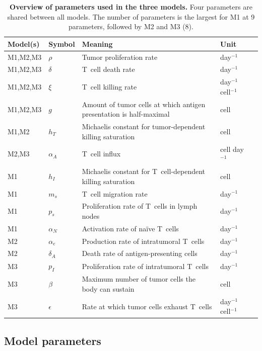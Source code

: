 \documentclass[a4paper,10pt]{article}
\begin{document}
\begin{table}
\begin{tabularx}{\textwidth}{llXlX}
\bfseries Model(s) & \bfseries Symbol & \bfseries Meaning & \bfseries Unit \\ 
\hline 
M1,M2,M3 & $\rho$ & Tumor proliferation rate & day$^{-1} $ \\
M1,M2,M3 & $\delta$ & T~cell death rate & day$^{-1} $  \\
M1,M2,M3 & $\xi$ & T~cell killing rate & day$^{-1}$ cell$^{-1}$ \\
M1,M2,M3 & $g$ & Amount of tumor cells at which antigen presentation is half-maximal & cell \\
M1,M2 & $h_T$  & Michaelis constant for tumor-dependent killing saturation & cell \\
\phantom{M1,}M2,M3 & $\alpha_A$ & T~cell influx & cell day$^{-1}$ \\
M1 & $h_I$  & Michaelis constant for T~cell-dependent killing saturation & cell \\
M1 & $m_s$ & T~cell migration rate & day$^{-1} $ \\
M1 & $p_s$ & Proliferation rate of T~cells in lymph nodes & day$^{-1} $ \\
M1 & $\alpha_N$ & Activation rate of na\"ive T~cells & day$^{-1} $ \\
\phantom{M1,}M2 & $\alpha_e$ & Production rate of intratumoral T~cells & day$^{-1} $ \\
\phantom{M1,}M2 & $\delta_A$ & Death rate of antigen-presenting cells & day$^{-1} $ \\
\phantom{M1,M2,}M3 & $p_I$ & Proliferation rate of intratumoral T~cells & day$^{-1}$ \\
\phantom{M1,M2,}M3 & $\beta$ & Maximum number of tumor cells the body can sustain & cell \\
\phantom{M1,M2,}M3 & $\epsilon$ & Rate at which tumor cells exhaust T~cells & day$^{-1}$ cell$^{-1}$ \\
\end{tabularx}
\caption{{\bfseries Overview of parameters used in the three models.} Four parameters are shared between all models. The number of parameters is the largest for M1 at 9 parameters, followed by M2 and M3 (8).}
\label{tab:whichpars}
\end{table}

\subsection*{Model parameters}
\end{document}
